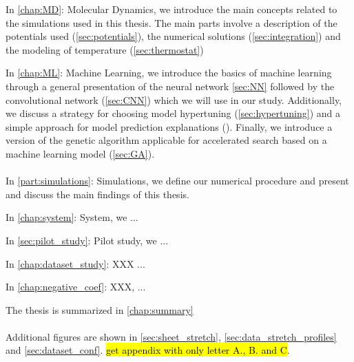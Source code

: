 In \cref{chap:MD}: Molecular Dynamics, we introduce the main concepts related to the simulations used in this thesis. The main parts involve a description of the potentials used (\cref{sec:potentials}), the numerical solutions (\cref{sec:integration}) and the modeling of temperature (\cref{sec:thermostat})

In \cref{chap:ML}: Machine Learning, we introduce the basics of machine learning through a general presentation of the neural network \cref{sec:NN} followed by the convolutional network (\cref{sec:CNN}) which we will use in our study. Additionally, we discuss a strategy for choosing model hypertuning (\cref{sec:hypertuning}) and a simple approach for model prediction explanations (\label{sec:explanation}). Finally, we introduce a version of the genetic algorithm applicable for accelerated search based on a machine learning model (\cref{sec:GA}).
\\
\\
In \cref{part:simulations}: Simulations, we define our numerical procedure and present and discuss the main findings of this thesis. 


In \cref{chap:system}: System, we ...

In \cref{sec:pilot_study}: Pilot study, we ...

In \cref{chap:dataset_study}: XXX ...

In \cref{chap:negative_coef}: XXX, ...

The thesis is summarized in \cref{chap:summary}
\\
\\
Additional figures are shown in \cref{sec:sheet_stretch}, \cref{sec:data_stretch_profiles} and \cref{sec:dataset_conf}. \hl{get appendix with only letter A., B. and C}.





